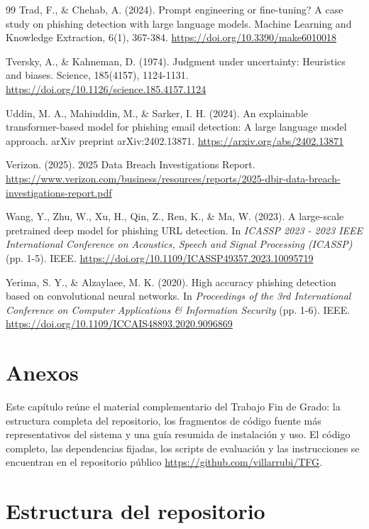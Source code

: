 \documentclass[11pt,a4paper,oneside]{report}
\begin{document}
\begin{thebibliography}{99}
 Trad, F., \& Chehab, A. (2024). Prompt engineering or fine-tuning? A case study on phishing detection with large language models. Machine Learning and Knowledge Extraction, 6(1), 367-384. \url{https://doi.org/10.3390/make6010018}

 Tversky, A., \& Kahneman, D. (1974). Judgment under uncertainty: Heuristics and biases. Science, 185(4157), 1124-1131. \url{https://doi.org/10.1126/science.185.4157.1124}

 Uddin, M. A., Mahiuddin, M., \& Sarker, I. H. (2024). An explainable transformer-based model for phishing email detection: A large language model approach. arXiv preprint arXiv:2402.13871. \url{https://arxiv.org/abs/2402.13871}

 Verizon. (2025). 2025 Data Breach Investigations Report. \url{https://www.verizon.com/business/resources/reports/2025-dbir-data-breach-investigations-report.pdf}

 Wang, Y., Zhu, W., Xu, H., Qin, Z., Ren, K., \& Ma, W. (2023). A large-scale pretrained deep model for phishing URL detection. In \emph{ICASSP 2023 - 2023 IEEE International Conference on Acoustics, Speech and Signal Processing (ICASSP)} (pp. 1-5). IEEE. \url{https://doi.org/10.1109/ICASSP49357.2023.10095719}

 Yerima, S. Y., \& Alzaylaee, M. K. (2020). High accuracy phishing detection based on convolutional neural networks. In \emph{Proceedings of the 3rd International Conference on Computer Applications \& Information Security} (pp. 1-6). IEEE. \url{https://doi.org/10.1109/ICCAIS48893.2020.9096869}

\end{thebibliography}

\appendix
\chapter*{Anexos}

Este capítulo reúne el material complementario del Trabajo Fin de Grado: la estructura completa del repositorio, los fragmentos de código fuente más representativos del sistema y una guía resumida de instalación y uso. El código completo, las dependencias fijadas, los scripts de evaluación y las instrucciones se encuentran en el repositorio público \url{https://github.com/villarrubi/TFG}.

\chapter{Estructura del repositorio}
\end{document}

